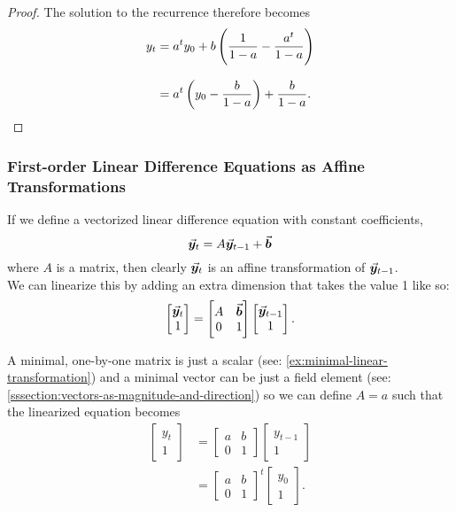 \documentclass[MathsNotesBase.tex]{subfiles}
\begin{document}
{\begin{proof}
			The solution to the recurrence therefore becomes
			\begin{align*}
			y_t &= a^t y_0 + b \left(\frac{1}{1 - a} - \frac{a^t}{1 - a}\right) \\[8pt]
			&= a^t \left(y_0 - \frac{b}{1-a}\right) + \frac{b}{1-a}. \qedhere \\
			\end{align*}
		\end{proof}
	
	
		\biggerskip
		\subsubsection{First-order Linear Difference Equations as Affine Transformations}
		\def\y{\V{y}}
		If we define a vectorized linear difference equation with constant coefficients,
		\[ \y_t = A\y_{t-1} + \b \]
		where $A$ is a matrix, then clearly $\y_t$ is an affine transformation of $\y_{t-1}$.\\
		
		We can linearize this by adding an extra dimension that takes the value 1 like so:
		\[	\begin{bmatrix}
				\y_t\\
				1
			\end{bmatrix} =
			\begin{bmatrix}
				A & \b\\
				0 & 1
	  		\end{bmatrix}
			\begin{bmatrix}
				\y_{t-1}\\
				1
			\end{bmatrix}.
		\]
		
		\bigskip
		A minimal, one-by-one matrix is just a scalar (see: \ref{ex:minimal-linear-transformation}) and a minimal vector can be just a field element (see: \ref{sssection:vectors-as-magnitude-and-direction}) so we can define ${ A = a }$ such that the linearized equation becomes
		\begin{align*}
		\begin{bmatrix}
			y_t\\
			1
		\end{bmatrix} &=
		\begin{bmatrix}
			a & b\\
			0 & 1
		\end{bmatrix}
		\begin{bmatrix}
			y_{t-1}\\
			1
		\end{bmatrix} \\[8pt]
		&=
		\begin{bmatrix}
			a & b\\
			0 & 1
		\end{bmatrix}^t
		\begin{bmatrix}
			y_0\\
			1
		\end{bmatrix}.
		\end{align*}
	
}
\end{document}
